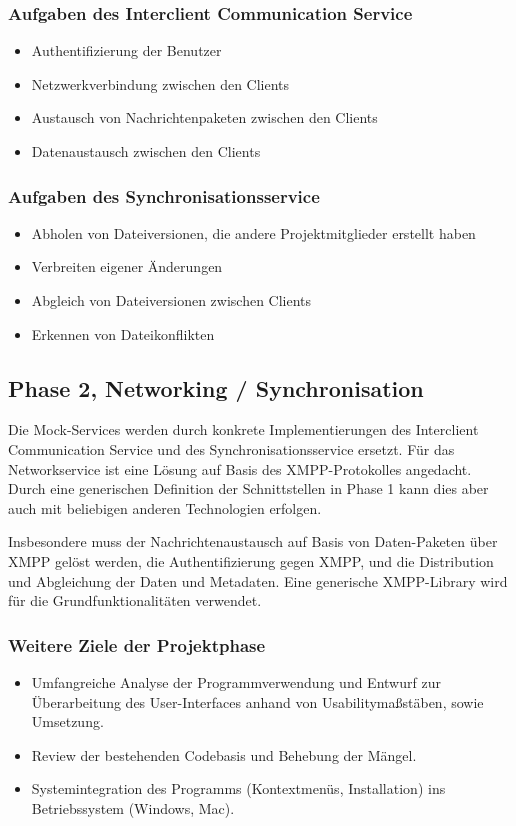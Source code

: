 \subsubsection{Aufgaben des Interclient Communication Service}
\begin{itemize}
\item Authentifizierung der Benutzer
\item Netzwerkverbindung zwischen den Clients
\item Austausch von Nachrichtenpaketen zwischen den Clients
\item Datenaustausch zwischen den Clients
\end{itemize}
\subsubsection{Aufgaben des Synchronisationsservice}
\begin{itemize}
\item Abholen von Dateiversionen, die andere Projektmitglieder erstellt haben
\item Verbreiten eigener Änderungen
\item Abgleich von Dateiversionen zwischen Clients
\item Erkennen von Dateikonflikten
\end{itemize}
\subsection{Phase 2, Networking / Synchronisation}
Die Mock-Services werden durch konkrete Implementierungen des Interclient Communication Service und des Synchronisationsservice ersetzt. Für das Networkservice ist eine Lösung auf Basis des XMPP-Protokolles angedacht. Durch eine generischen Definition der Schnittstellen in Phase 1 kann dies aber auch mit beliebigen anderen Technologien erfolgen.


Insbesondere muss der Nachrichtenaustausch auf Basis von Daten-Paketen über XMPP gelöst werden, die Authentifizierung gegen XMPP, und die Distribution und Abgleichung der Daten und Metadaten.
Eine generische XMPP-Library wird für die Grundfunktionalitäten verwendet.

\subsubsection{Weitere Ziele der Projektphase}
\begin{itemize}
\item Umfangreiche Analyse der Programmverwendung und Entwurf zur Überarbeitung des User-Interfaces anhand von Usabilitymaßstäben, sowie Umsetzung.
\item Review der bestehenden Codebasis und Behebung der Mängel.
\item Systemintegration des Programms (Kontextmenüs, Installation) ins Betriebssystem (Windows, Mac).
\end{itemize}

